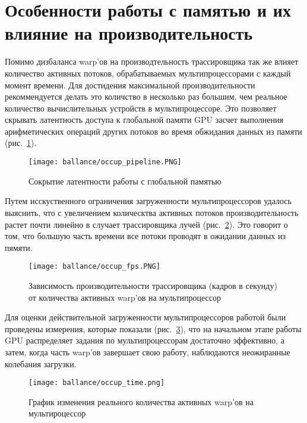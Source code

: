 \section{Особенности работы с памятью и их влияние на производительность}

Помимо дизбаланса warp'ов на производтельность трассировщика так же влияет количество активных потоков, обрабатываемых мультипроцессорами с каждый момент времени. Для достидения максимальной производительности рекоммендуется делать это количство в несколько раз большим, чем реальное количество вычислительных устройств в мультипроцессоре. Это позволяет скрывать латентность доступа к глобальной памяти GPU засчет выполнения арифметических операций других потоков во время обжидания данных из памяти (рис.~\ref{fig:occup_pipeline}).

\begin{figure}[h]
\center
\texttt{[image: ballance/occup\_pipeline.PNG]}
\caption{Сокрытие латентности работы с глобальной памятью}
\label{fig:occup_pipeline}
\end{figure}

Путем исскуственного ограничения загруженности мультипроцессоров удалось выяснить, что с увеличением колическтва активных потоков производительность растет почти линейно в случает трассировщика лучей (рис.~\ref{fig:occup_fps}). Это говорит о том, что большую часть времени все потоки проводят в ожидании данных из пямяти.

\begin{figure}[h]
\center
\texttt{[image: ballance/occup\_fps.PNG]}
\caption{Зависимость производительности трассировщика (кадров в секунду) от количества активных warp'ов на мультипроцессор}
\label{fig:occup_fps}
\end{figure}

Для оценки действительной загруженности мультипроцессоров работой были проведены измерения, которые показали (рис.~\ref{fig:occup_time}), что на начальном этапе работы GPU распределяет задания по мультипроцессорам достаточно эффективно, а затем, когда часть warp'ов завершает свою работу, наблюдаются неожиранные колебания загрузки.

\begin{figure}[h]
\center
\texttt{[image: ballance/occup\_time.png]}
\caption{График изменения реального количества активных warp'ов на мультироцессор}
\label{fig:occup_time}
\end{figure}

